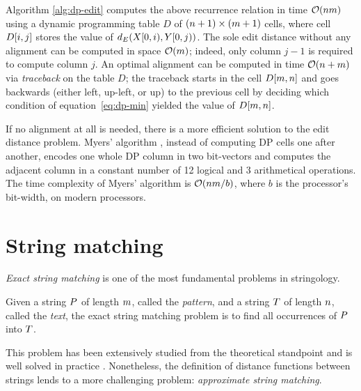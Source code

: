Algorithm \ref{alg:dp-edit} computes the above recurrence relation in time $\mathcal{O}(nm)$ using a dynamic programming table $D$ of $(n+1) \times (m+1)$ cells, where cell $D[i,j]$ stores the value of $d_E(X[0,i),Y[0,j))$.
The sole edit distance without any alignment can be computed in space $\mathcal{O}(m)$; indeed, only column $j-1$ is required to compute column $j$.
An optimal alignment can be computed in time $\mathcal{O}(n + m)$ via \emph{traceback} on the table $D$;
the traceback starts in the cell $D[m,n]$ and goes backwards (either left, up-left, or up) to the previous cell by deciding which condition of equation~\ref{eq:dp-min} yielded the value of $D[m,n]$.

If no alignment at all is needed, there is a more efficient solution to the edit distance problem.
Myers' algorithm \citep{Myers1999}, instead of computing DP cells one after another, encodes one whole DP column in two bit-vectors and computes the adjacent column in a constant number of 12 logical and 3 arithmetical operations.
The time complexity of Myers' algorithm is $\mathcal{O}(nm/b)$, where $b$ is the processor's bit-width,  on modern processors.


\section{String matching}

\emph{Exact string matching} is one of the most fundamental problems in stringology.
\begin{definition}
\citep{Gusfield1997}
Given a string $P$ of length $m$, called the \emph{pattern}, and a string $T$ of length $n$, called the \emph{text}, the exact string matching problem is to find all occurrences of $P$ into $T$.
\end{definition}

This problem has been extensively studied from the theoretical standpoint and is well solved in practice \citep{Faro2013}.
Nonetheless, the definition of distance functions between strings lends to a more challenging problem: \emph{approximate string matching}.

